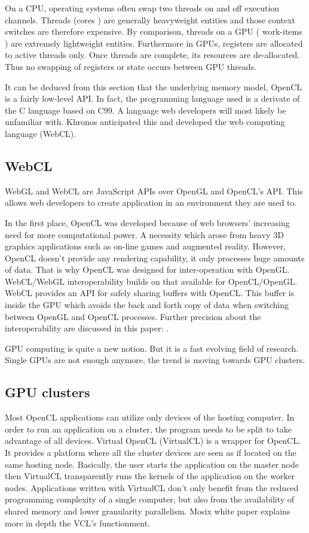On a CPU, operating systems often swap two threads on and off execution
channels. Threads (cores ) are generally heavyweight entities and those context
switches are therefore expensive. By comparison, threads on a GPU ( work-items
) are extremely lightweight entities. Furthermore in GPUs, registers are
allocated to active threads only. Once threads are complete, its resources are
de-allocated.  Thus no swapping of registers or state occurs between GPU
threads. \citep{Reference4}

It can be deduced from this section that the underlying memory model, OpenCL is a
fairly low-level API. In fact, the programming language used is a derivate of
the C language based on C99. A language web developers will most likely be
unfamiliar with. Khronos anticipated this and developed the web computing
language (WebCL).

\subsection{WebCL}

WebGL and WebCL are JavaScript APIs over OpenGL and OpenCL's API. This allows
web developers to create application in an environment they are used to.

In the first place, OpenCL was developed because of web browsers' increasing
need for more computational power. A necessity which arose from heavy 3D
graphics applications such as on-line games and augmented reality. However,
OpenCL doesn’t provide any rendering capability, it only processes huge amounts
of data. That is why OpenCL was designed for inter-operation with OpenGL.
WebCL/WebGL interoperability builds on that available for OpenCL/OpenGL. WebCL
provides an API for safely sharing buffers with OpenCL. This buffer is inside
the GPU which avoids the back and forth copy of data when switching between
OpenGL and OpenCL processes. Further precision about the interoperability are
discussed in this paper: \citep{Reference6}.

GPU computing is quite a new notion. But it is a fast evolving field of
research. Single GPUs are not enough anymore, the trend is moving towards GPU
clusters.

\subsection{GPU clusters}

Most OpenCL applications can utilize only devices of the hosting computer. In
order to run an application on a cluster, the program needs to be split to take
advantage of all devices. Virtual OpenCL (VirtualCL) is a wrapper for OpenCL.
It provides a platform where all the cluster devices are seen as if located on
the same hosting node. Basically, the user starts the application on the master
node then VirtualCL transparently runs the kernels of the application on the
worker nodes. Applications written with VirtualCL don't only benefit from the
reduced programming complexity of a single computer, but also from the
availability of shared memory and lower granularity parallelism. Mosix white
paper \citep{Reference7} explains more in depth the VCL's functionment.


